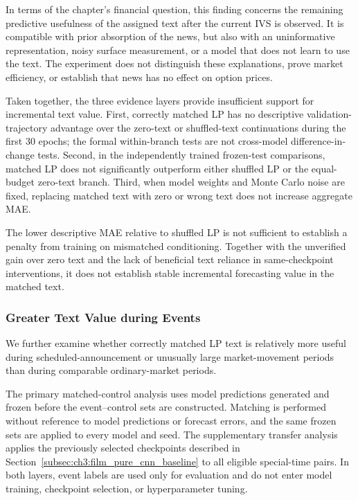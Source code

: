 In terms of the chapter's financial question, this finding concerns the
remaining predictive usefulness of the assigned text after the current IVS
is observed. It is compatible with prior absorption of the news, but also
with an uninformative representation, noisy surface measurement, or a model
that does not learn to use the text. The experiment does not distinguish
these explanations, prove market efficiency, or establish that news has no
effect on option prices.



Taken together, the three evidence layers provide insufficient
support for incremental text value. First, correctly matched LP
has no descriptive validation-trajectory advantage over the zero-text or
shuffled-text continuations during the first 30 epochs; the formal within-branch
tests are not cross-model difference-in-change tests. Second, in the independently
trained frozen-test comparisons, matched LP does not significantly outperform
either shuffled LP or the equal-budget zero-text branch. Third, when model
weights and Monte Carlo noise are fixed, replacing
matched text with zero or wrong text does not increase aggregate MAE.

The lower descriptive MAE relative to shuffled LP is not sufficient to
establish a penalty from training on mismatched conditioning. Together with
the unverified gain over zero text and the lack of beneficial text reliance
in same-checkpoint interventions, it does not establish stable incremental
forecasting value in the matched text. 





\subsubsection*{Greater Text Value during Events}
\label{subsec:ch3:rq4_conditional_text_value}

We further examine whether correctly matched LP text is relatively more useful
during scheduled-announcement or unusually large market-movement periods than
during comparable ordinary-market periods.





The primary matched-control analysis uses model predictions generated and frozen before the event--control sets are constructed. Matching is performed without reference to model predictions or forecast errors, and the same frozen sets are applied to every model and seed. The supplementary transfer analysis applies the previously selected checkpoints described in Section~\ref{subsec:ch3:film_pure_cnn_baseline} to all eligible special-time pairs. In both layers, event labels are used only for evaluation and do not enter model training, checkpoint selection, or hyperparameter tuning.



